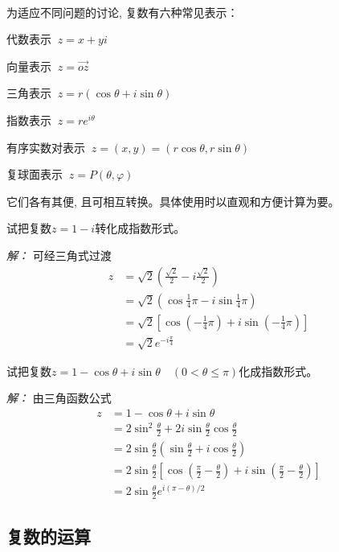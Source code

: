 ~\\
\begin{hint}
    为适应不同问题的讨论, 复数有六种常见表示：
    \begin{compactitem}
      \item 代数表示 $~ z=x+yi$
      \item 向量表示 $~ z= \overrightarrow{oz}$ 
      \item 三角表示  $~ z=r (\cos \theta + i\sin \theta)$
      \item 指数表示  $~ z= r e^{i \theta}$
      \item 有序实数对表示  $~ z=(x,y)= (r\cos \theta, r\sin \theta )$
      \item 复球面表示 $~ z= P(\theta, \varphi)$
    \end{compactitem}
    它们各有其便, 且可相互转换。具体使用时以直观和方便计算为要。 
\end{hint}
\begin{example}
    试把复数$z=1-i$转化成指数形式。
\end{example}
\emph{解： } 可经三角式过渡
\[ \begin{aligned} 
    z&= \sqrt{2} (\frac{\sqrt{2} }{2} - i\frac{\sqrt{2} }{2}) \\
     &= \sqrt{2} (\cos \frac{1}{4}\pi - i\sin \frac{1}{4}\pi  ) \\
     &= \sqrt{2} [\cos (-\frac{1}{4}\pi) + i\sin (-\frac{1}{4}\pi  )]\\
     &= \sqrt{2}  e^{-i \frac{\pi}{4}} 
\end{aligned}\]
\begin{example}
    试把复数$z=1-\cos \theta + i \sin \theta \quad (0 < \theta \le \pi)$化成指数形式。
\end{example}
\emph{解： }由三角函数公式
\[ \begin{aligned} 
    z&= 1-\cos \theta + i \sin \theta \\
     &= 2 \sin ^2 \frac{\theta}{2}  + 2i \sin \frac{\theta}{2} \cos \frac{\theta}{2}\\
     &= 2 \sin \frac{\theta}{2}  (\sin \frac{\theta}{2}  +  i\cos \frac{\theta}{2} ) \\
     &= 2  \sin \frac{\theta}{2} [ \cos ( \frac{\pi}{2} -\frac{\theta}{2}) + i\sin ( \frac{\pi}{2} -\frac{\theta}{2}) ] \\
     &= 2\sin \frac{\theta}{2} e^{i (\pi-\theta) /2}
\end{aligned}\]

\subsection{复数的运算} ~\\

